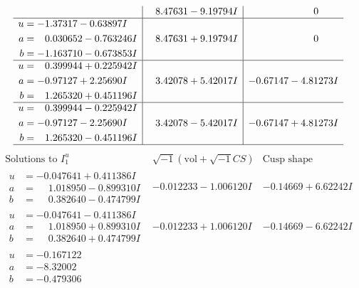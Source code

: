 \documentclass[1p]{elsarticle_modified}
\theoremstyle{definition}
\newcommand{\I}{\sqrt{-1}}
\begin{document}
$$\begin{array}{c|c|c}
 & \phantom{-}8.47631 - 9.19794 I & \phantom{-0.000000 } 0 \\ \hline\begin{aligned}
u &= -1.37317 - 0.63897 I \\
a &= \phantom{-}0.030652 - 0.763246 I \\
b &= -1.163710 - 0.673853 I\end{aligned}
 & \phantom{-}8.47631 + 9.19794 I & \phantom{-0.000000 } 0 \\ \hline\begin{aligned}
u &= \phantom{-}0.399944 + 0.225942 I \\
a &= -0.97127 + 2.25690 I \\
b &= \phantom{-}1.265320 + 0.451196 I\end{aligned}
 & \phantom{-}3.42078 + 5.42017 I & -0.67147 - 4.81273 I \\ \hline\begin{aligned}
u &= \phantom{-}0.399944 - 0.225942 I \\
a &= -0.97127 - 2.25690 I \\
b &= \phantom{-}1.265320 - 0.451196 I\end{aligned}
 & \phantom{-}3.42078 - 5.42017 I & -0.67147 + 4.81273 I\\
 \hline 
 \end{array}$$\newpage$$\begin{array}{c|c|c}  
\text{Solutions to }I^u_{1}& \I (\text{vol} + \sqrt{-1}CS) & \text{Cusp shape}\\
 \hline 
\begin{aligned}
u &= -0.047641 + 0.411386 I \\
a &= \phantom{-}1.018950 - 0.899310 I \\
b &= \phantom{-}0.382640 - 0.474799 I\end{aligned}
 & -0.012233 - 1.006120 I & -0.14669 + 6.62242 I \\ \hline\begin{aligned}
u &= -0.047641 - 0.411386 I \\
a &= \phantom{-}1.018950 + 0.899310 I \\
b &= \phantom{-}0.382640 + 0.474799 I\end{aligned}
 & -0.012233 + 1.006120 I & -0.14669 - 6.62242 I \\ \hline\begin{aligned}
u &= -0.167122\phantom{ +0.000000I} \\
a &= -8.32002\phantom{ +0.000000I} \\
b &= -0.479306\phantom{ +0.000000I}\end{aligned}

\end{array}$$
\end{document}
